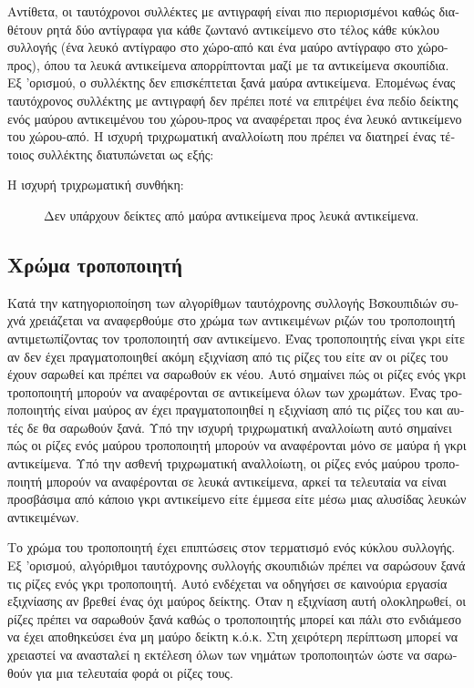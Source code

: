 \begin{greek}
Αντίθετα, οι ταυτόχρονοι συλλέκτες με αντιγραφή είναι πιο
περιορισμένοι καθώς διαθέτουν ρητά δύο αντίγραφα για κάθε
ζωντανό αντικείμενο στο τέλος κάθε κύκλου συλλογής (ένα
λευκό αντίγραφο στο χώρο-από και ένα μαύρο αντίγραφο στο
χώρο-προς), όπου τα λευκά αντικείμενα απορρίπτονται μαζί
με τα αντικείμενα σκουπίδια. Εξ 'ορισμού, ο συλλέκτης δεν
επισκέπτεται ξανά μαύρα αντικείμενα. Επομένως ένας ταυτόχρονος
συλλέκτης με αντιγραφή δεν πρέπει ποτέ να επιτρέψει ένα
πεδίο δείκτης ενός μαύρου αντικειμένου του χώρου-προς να
αναφέρεται προς ένα λευκό αντικείμενο του χώρου-από.
Η ισχυρή τριχρωματική αναλλοίωτη που πρέπει να διατηρεί
ένας τέτοιος συλλέκτης διατυπώνεται ως εξής:

\begin{description}
  \item[Η ισχυρή τριχρωματική συνθήκη:] Δεν υπάρχουν δείκτες
από μαύρα αντικείμενα προς λευκά αντικείμενα.
\end{description}

\subsection{Χρώμα τροποποιητή}
Κατά την κατηγοριοποίηση των αλγορίθμων ταυτόχρονης συλλογής
Bσκουπιδιών συχνά χρειάζεται να αναφερθούμε στο χρώμα των
αντικειμένων ριζών του τροποποιητή αντιμετωπίζοντας τον
τροποποιητή σαν αντικείμενο. Ένας τροποποιητής είναι γκρι
είτε αν δεν έχει πραγματοποιηθεί ακόμη εξιχνίαση από τις
ρίζες του είτε αν οι ρίζες του έχουν σαρωθεί και πρέπει
να σαρωθούν εκ νέου. Αυτό σημαίνει πώς οι ρίζες ενός γκρι
τροποποιητή μπορούν να αναφέρονται σε αντικείμενα όλων των
χρωμάτων. Ένας τροποποιητής είναι μαύρος αν έχει πραγματοποιηθεί
η εξιχνίαση από τις ρίζες του και αυτές δε θα σαρωθούν ξανά.
Υπό την ισχυρή τριχρωματική αναλλοίωτη αυτό σημαίνει πώς
οι ρίζες ενός μαύρου τροποποιητή μπορούν να αναφέρονται
μόνο σε μαύρα ή γκρι αντικείμενα. Υπό την ασθενή τριχρωματική
αναλλοίωτη, οι ρίζες ενός μαύρου τροποποιητή μπορούν να
αναφέρονται σε λευκά αντικείμενα, αρκεί τα τελευταία να είναι
προσβάσιμα από κάποιο γκρι αντικείμενο είτε έμμεσα είτε μέσω
μιας αλυσίδας λευκών αντικειμένων.

Το χρώμα του τροποποιητή έχει επιπτώσεις στον τερματισμό
ενός κύκλου συλλογής. Εξ 'ορισμού, αλγόριθμοι ταυτόχρονης
συλλογής σκουπιδιών πρέπει να σαρώσουν ξανά τις ρίζες ενός
γκρι τροποποιητή. Αυτό ενδέχεται να οδηγήσει σε καινούρια
εργασία εξιχνίασης αν βρεθεί ένας όχι μαύρος δείκτης. Όταν
η εξιχνίαση αυτή ολοκληρωθεί, οι ρίζες πρέπει να σαρωθούν
ξανά καθώς ο τροποποιητής μπορεί και πάλι στο ενδιάμεσο
να έχει αποθηκεύσει ένα μη μαύρο δείκτη κ.ό.κ. Στη χειρότερη
περίπτωση μπορεί να χρειαστεί να ανασταλεί η εκτέλεση όλων
των νημάτων τροποποιητών ώστε να σαρωθούν για μια τελευταία
φορά οι ρίζες τους.


\end{greek}
